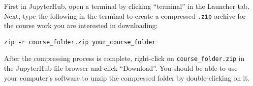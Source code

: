 \documentclass[
]{krantz}
\begin{document}
First in JupyterHub, open a terminal by clicking ``terminal'' in the Launcher tab.
Next, type the following in the terminal to create a
compressed \texttt{.zip} archive for the course work you are interested in downloading:

\begin{verbatim}
zip -r course_folder.zip your_course_folder
\end{verbatim}

After the compressing process is complete, right-click on \texttt{course\_folder.zip}
in the JupyterHub file browser
and click ``Download''. You should be able to use your computer's software to unzip
the compressed folder by double-clicking on it.

  

\backmatter
\printindex
\end{document}

